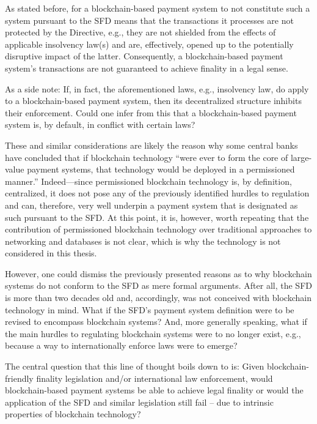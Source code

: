 As stated before, for a blockchain-based payment system to not constitute such a system pursuant to the SFD means that the transactions it processes are not protected by the Directive, e.g., they are not shielded from the effects of applicable insolvency law(s) and are, effectively, opened up to the potentially disruptive impact of the latter.
Consequently, a blockchain-based payment system's transactions are not guaranteed to achieve finality in a legal sense.

As a side note:
If, in fact, the aforementioned laws, e.g., insolvency law, do apply to a blockchain-based payment system, then its decentralized structure inhibits their enforcement. 
Could one infer from this that a blockchain-based payment system is, by default, in conflict with certain laws?

These and similar considerations are likely the reason why some central banks have concluded that if blockchain technology ``were ever to form the core of large-value payment systems, that technology would be deployed in a permissioned manner.'' \autocite{liao2017}
Indeed---since permissioned blockchain technology is, by definition, centralized, it does not pose any of the previously identified hurdles to regulation and can, therefore, very well underpin a payment system that is designated as such pursuant to the SFD.
At this point, it is, however, worth repeating that the contribution of permissioned blockchain technology over traditional approaches to networking and databases is not clear, which is why the technology is not considered in this thesis.

However, one could dismiss the previously presented reasons as to why blockchain systems do not conform to the SFD as mere formal arguments.
After all, the SFD is more than two decades old and, accordingly, was not conceived with blockchain technology in mind.
What if the SFD's payment system definition were to be revised to encompass blockchain systems?
And, more generally speaking, what if the main hurdles to regulating blockchain systems were to no longer exist, e.g., because a way to internationally enforce laws were to emerge?

The central question that this line of thought boils down to is:
Given blockchain-friendly finality legislation and/or international law enforcement, would blockchain-based payment systems be able to achieve legal finality or would the application of the SFD and similar legislation still fail -- due to intrinsic properties of blockchain technology?

